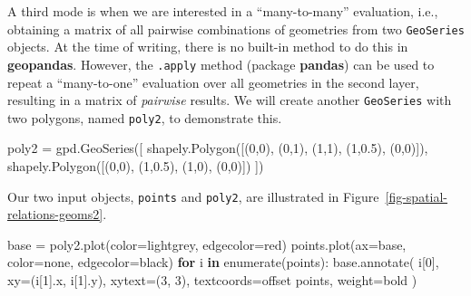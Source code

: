 \documentclass[
  letterpaper,
]{krantz}
\newenvironment{Shaded}{\begin{snugshade}}{\end{snugshade}}
\newcommand{\BuiltInTok}[1]{\textcolor[rgb]{0.00,0.23,0.31}{#1}}
\newcommand{\ControlFlowTok}[1]{\textcolor[rgb]{0.00,0.23,0.31}{\textbf{#1}}}
\newcommand{\DecValTok}[1]{\textcolor[rgb]{0.68,0.00,0.00}{#1}}
\newcommand{\FloatTok}[1]{\textcolor[rgb]{0.68,0.00,0.00}{#1}}
\newcommand{\KeywordTok}[1]{\textcolor[rgb]{0.00,0.23,0.31}{\textbf{#1}}}
\newcommand{\NormalTok}[1]{\textcolor[rgb]{0.00,0.23,0.31}{#1}}
\newcommand{\OperatorTok}[1]{\textcolor[rgb]{0.37,0.37,0.37}{#1}}
\newcommand{\StringTok}[1]{\textcolor[rgb]{0.13,0.47,0.30}{#1}}
\begin{document}
A third mode is when we are interested in a ``many-to-many'' evaluation,
i.e., obtaining a matrix of all pairwise combinations of geometries from
two \texttt{GeoSeries} objects. At the time of writing, there is no
built-in method to do this in \textbf{geopandas}. However, the
\texttt{.apply} method (package \textbf{pandas}) can be used to repeat a
``many-to-one'' evaluation over all geometries in the second layer,
resulting in a matrix of \emph{pairwise} results. We will create another
\texttt{GeoSeries} with two polygons, named \texttt{poly2}, to
demonstrate this.

\begin{Shaded}
\begin{Highlighting}[]
\NormalTok{poly2 }\OperatorTok{=}\NormalTok{ gpd.GeoSeries([}
\NormalTok{  shapely.Polygon([(}\DecValTok{0}\NormalTok{,}\DecValTok{0}\NormalTok{), (}\DecValTok{0}\NormalTok{,}\DecValTok{1}\NormalTok{), (}\DecValTok{1}\NormalTok{,}\DecValTok{1}\NormalTok{), (}\DecValTok{1}\NormalTok{,}\FloatTok{0.5}\NormalTok{), (}\DecValTok{0}\NormalTok{,}\DecValTok{0}\NormalTok{)]),}
\NormalTok{  shapely.Polygon([(}\DecValTok{0}\NormalTok{,}\DecValTok{0}\NormalTok{), (}\DecValTok{1}\NormalTok{,}\FloatTok{0.5}\NormalTok{), (}\DecValTok{1}\NormalTok{,}\DecValTok{0}\NormalTok{), (}\DecValTok{0}\NormalTok{,}\DecValTok{0}\NormalTok{)])}
\NormalTok{])}
\end{Highlighting}
\end{Shaded}

Our two input objects, \texttt{points} and \texttt{poly2}, are
illustrated in Figure~\ref{fig-spatial-relations-geoms2}.

\begin{Shaded}
\begin{Highlighting}[]
\NormalTok{base }\OperatorTok{=}\NormalTok{ poly2.plot(color}\OperatorTok{=}\StringTok{\textquotesingle{}lightgrey\textquotesingle{}}\NormalTok{, edgecolor}\OperatorTok{=}\StringTok{\textquotesingle{}red\textquotesingle{}}\NormalTok{)}
\NormalTok{points.plot(ax}\OperatorTok{=}\NormalTok{base, color}\OperatorTok{=}\StringTok{\textquotesingle{}none\textquotesingle{}}\NormalTok{, edgecolor}\OperatorTok{=}\StringTok{\textquotesingle{}black\textquotesingle{}}\NormalTok{)}
\ControlFlowTok{for}\NormalTok{ i }\KeywordTok{in} \BuiltInTok{enumerate}\NormalTok{(points):}
\NormalTok{    base.annotate(}
\NormalTok{        i[}\DecValTok{0}\NormalTok{], xy}\OperatorTok{=}\NormalTok{(i[}\DecValTok{1}\NormalTok{].x, i[}\DecValTok{1}\NormalTok{].y), }
\NormalTok{        xytext}\OperatorTok{=}\NormalTok{(}\DecValTok{3}\NormalTok{, }\DecValTok{3}\NormalTok{), textcoords}\OperatorTok{=}\StringTok{\textquotesingle{}offset points\textquotesingle{}}\NormalTok{, weight}\OperatorTok{=}\StringTok{\textquotesingle{}bold\textquotesingle{}}
\NormalTok{    )}
\end{Highlighting}
\end{Shaded}
\end{document}
